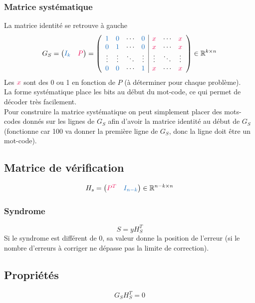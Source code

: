 \documentclass[resume.tex]{subfiles}
\begin{document}
\subsubsection{Matrice systématique}
La matrice identité se retrouve à gauche
$$G_S=\begin{pmatrix}
\textcolor{RoyalBlue}{I_k} & \textcolor{OrangeRed}{P}
\end{pmatrix}=
\left(\begin{array}{cccc|cccc}
\textcolor{RoyalBlue}{1} & \textcolor{RoyalBlue}{0} & \cdots & \textcolor{RoyalBlue}{0} & \textcolor{OrangeRed}{x} & \cdots & \textcolor{OrangeRed}{x}\\
\textcolor{RoyalBlue}{0} & \textcolor{RoyalBlue}{1} & \cdots & \textcolor{RoyalBlue}{0} & \textcolor{OrangeRed}{x} & \cdots & \textcolor{OrangeRed}{x}\\
\vdots & \vdots & \ddots & \vdots & \vdots & \ddots & \vdots\\
\textcolor{RoyalBlue}{0} & \textcolor{RoyalBlue}{0} & \cdots & \textcolor{RoyalBlue}{1} & \textcolor{OrangeRed}{x} & \cdots & \textcolor{OrangeRed}{x}
\end{array}\right)\in\mathbb{R}^{k\times n}$$
Les $\textcolor{OrangeRed}{x}$ sont des 0 ou 1 en fonction de $P$ (à déterminer pour chaque problème).\\
La forme systématique place les bits au début du mot-code, ce qui permet de décoder très facilement.\\
Pour construire la matrice systématique on peut simplement placer des mots-codes donnés sur les lignes de $G_S$ afin d'avoir la matrice identité au début de $G_S$ (fonctionne car 100 va donner la première ligne de $G_S$, donc la ligne doit être un mot-code).
\subsection{Matrice de vérification}
$$H_s=\begin{pmatrix}
\textcolor{OrangeRed}{P^{T}} & \textcolor{RoyalBlue}{I_{n-k}}
\end{pmatrix}\in\mathbb{R}^{n-k\times n}$$
\subsubsection{Syndrome}
$$S=yH_S^T$$
Si le syndrome est différent de 0, sa valeur donne la position de l'erreur (si le nombre d'erreurs à corriger ne dépasse pas la limite de correction).




\subsection{Propriétés}
$$G_SH_S^T=0$$
\end{document}
